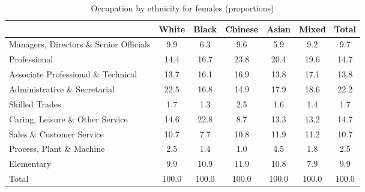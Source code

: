 \begin{table}[htbp]\centering
\def\sym#1{\ifmmode^{#1}\else\(^{#1}\)\fi}
\caption{Occupation by ethnicity for females (proportions)}
\begin{tabular}{l*{6}{c}}
\hline\hline
          &    White&    Black&  Chinese&    Asian&    Mixed&    Total\\
\hline
Managers, Directors \& Senior Officials         &      9.9&      6.3&      9.6&      5.9&      9.2&      9.7\\
Professional         &     14.4&     16.7&     23.8&     20.4&     19.6&     14.7\\
Associate Professional \& Technical         &     13.7&     16.1&     16.9&     13.8&     17.1&     13.8\\
Administrative \& Secretarial         &     22.5&     16.8&     14.9&     17.9&     18.6&     22.2\\
Skilled Trades         &      1.7&      1.3&      2.5&      1.6&      1.4&      1.7\\
Caring, Leisure \& Other Service         &     14.6&     22.8&      8.7&     13.3&     13.2&     14.7\\
Sales \& Customer Service         &     10.7&      7.7&     10.8&     11.9&     11.2&     10.7\\
Process, Plant \& Machine         &      2.5&      1.4&      1.0&      4.5&      1.8&      2.5\\
Elementary         &      9.9&     10.9&     11.9&     10.8&      7.9&      9.9\\
Total     &    100.0&    100.0&    100.0&    100.0&    100.0&    100.0\\
\hline\hline
\end{tabular}
\label{tab:occup_female}
\end{table}
